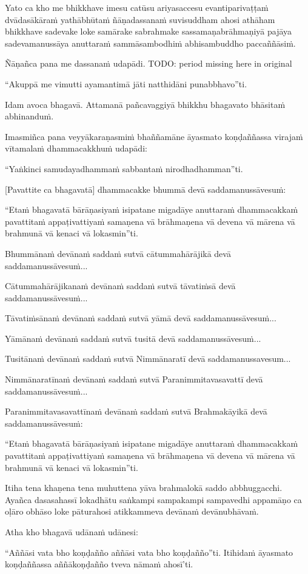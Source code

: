 Yato ca kho me bhikkhave imesu catūsu ariyasaccesu evantiparivaṭṭaṁ dvādasākāraṁ yathābhūtaṁ ñāṇadassanaṁ suvisuddham ahosi athāham bhikkhave sadevake loke samārake sabrahmake sassamaṇabrāhmaṇiyā pajāya sadevamanussāya anuttaraṁ sammāsambodhiṁ abhisambuddho paccaññāsiṁ.

Ñāṇañca pana me dassanaṁ udapādi. TODO: period missing here in original

“Akuppā me vimutti ayamantimā jāti natthidāni punabbhavo”ti.

Idam avoca bhagavā. Attamanā pañcavaggiyā bhikkhu bhagavato bhāsitaṁ abhinanduṁ.

Imasmiñca pana veyyākaraṇasmiṁ bhaññamāne āyasmato koṇḍaññassa virajaṁ vītamalaṁ dhammacakkhuṁ udapādi:

“Yaṅkinci samudayadhammaṁ sabbantaṁ nirodhadhamman”ti.

[Pavattite ca bhagavatā] dhammacakke bhummā devā saddamanussāvesuṁ:

“Etaṁ bhagavatā bārāṇasiyaṁ isipatane migadāye anuttaraṁ dhammacakkaṁ pavattitaṁ appaṭivattiyaṁ samaṇena vā brāhmaṇena vā devena vā mārena vā brahmunā vā kenaci vā lokasmin”ti.

Bhummānaṁ devānaṁ saddaṁ sutvā cātummahārājikā devā saddamanussāvesuṁ...

Cātummahārājikanaṁ devānaṁ saddaṁ sutvā tāvatiṁsā devā saddamanussāvesuṁ...

Tāvatiṁsānaṁ devānaṁ saddaṁ sutvā yāmā devā saddamanussāvesuṁ...

Yāmānaṁ devānaṁ saddaṁ sutvā tusitā devā saddamanussāvesuṁ...

Tusitānaṁ devānaṁ saddaṁ sutvā Nimmānaratī devā saddamanussavesum...

Nimmānaratīnaṁ devānaṁ saddaṁ sutvā Paranimmitavasavattī devā saddamanussāvesuṁ...

Paranimmitavasavattīnaṁ devānaṁ saddaṁ sutvā Brahmakāyikā devā saddamanussāvesuṁ:

“Etaṁ bhagavatā bārāṇasiyaṁ isipatane migadāye anuttaraṁ dhammacakkaṁ pavattitaṁ appaṭivattiyaṁ samaṇena vā brāhmaṇena vā devena vā mārena vā brahmunā vā kenaci vā lokasmin”ti.

Itiha tena khaṇena tena muhuttena yāva brahmalokā saddo abbhuggacchi. Ayañca dasasahassī lokadhātu saṅkampi sampakampi sampavedhi appamāṇo ca oḷāro obhāso loke pāturahosi atikkammeva devānaṁ devānubhāvaṁ.

Atha kho bhagavā udānaṁ udānesi:

“Aññāsi vata bho koṇḍañño aññāsi vata bho koṇḍañño”ti. Itihidaṁ āyasmato koṇḍaññassa aññākoṇḍañño tveva nāmaṁ ahosī’ti.

